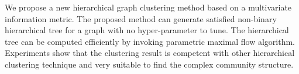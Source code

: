 We propose a new hierarchical graph clustering method based on a multivariate information metric.
The proposed method can generate satisfied non-binary hierarchical tree for a graph with no hyper-parameter to tune. 
The hierarchical tree can be computed efficiently by 
invoking parametric maximal flow algorithm. 
Experiments show that the clustering result is competent with 
other hierarchical clustering technique and very suitable to find the complex community structure.